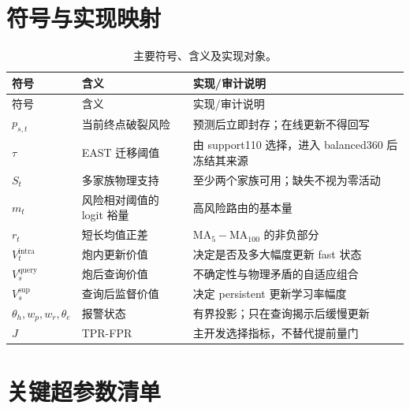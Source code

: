 \appendix
\section{符号与实现映射}

\begin{longtable}{@{}p{28mm}p{45mm}p{70mm}@{}}
\caption{主要符号、含义及实现对象。}\label{tab:symbols}\\
\toprule
符号 & 含义 & 实现/审计说明\\
\midrule
\endfirsthead
\toprule
符号 & 含义 & 实现/审计说明\\
\midrule
\endhead
$p_{s,t}$ & 当前终点破裂风险 & 预测后立即封存；在线更新不得回写\\
$\tau$ & EAST 迁移阈值 & 由 support110 选择，进入 balanced360 后冻结其来源\\
$S_t$ & 多家族物理支持 & 至少两个家族可用；缺失不视为零活动\\
$m_t$ & 风险相对阈值的 logit 裕量 & 高风险路由的基本量\\
$r_t$ & 短长均值正差 & $\mathrm{MA}_5-\mathrm{MA}_{100}$ 的非负部分\\
$V_t^{\mathrm{intra}}$ & 炮内更新价值 & 决定是否及多大幅度更新 fast 状态\\
$V_s^{\mathrm{query}}$ & 炮后查询价值 & 不确定性与物理矛盾的自适应组合\\
$V_s^{\mathrm{sup}}$ & 查询后监督价值 & 决定 persistent 更新学习率幅度\\
$\theta_h,w_p,w_r,\theta_e$ & 报警状态 & 有界投影；只在查询揭示后缓慢更新\\
$J$ & TPR-FPR & 主开发选择指标，不替代提前量门\\
\bottomrule
\end{longtable}

\section{关键超参数清单}

